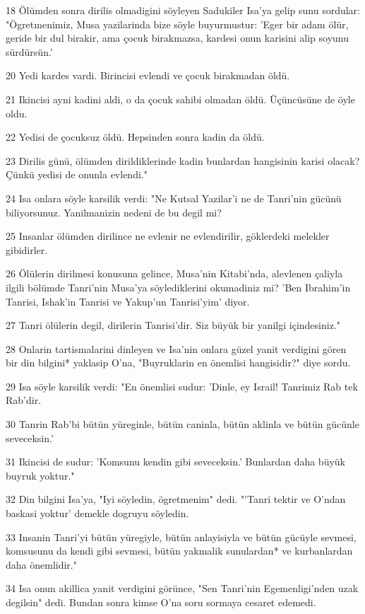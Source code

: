 \par 18 Ölümden sonra dirilis olmadigini söyleyen Sadukiler Isa'ya gelip sunu sordular: "Ögretmenimiz, Musa yazilarinda bize söyle buyurmustur: 'Eger bir adam ölür, geride bir dul birakir, ama çocuk birakmazsa, kardesi onun karisini alip soyunu sürdürsün.'
\par 20 Yedi kardes vardi. Birincisi evlendi ve çocuk birakmadan öldü.
\par 21 Ikincisi ayni kadini aldi, o da çocuk sahibi olmadan öldü. Üçüncüsüne de öyle oldu.
\par 22 Yedisi de çocuksuz öldü. Hepsinden sonra kadin da öldü.
\par 23 Dirilis günü, ölümden dirildiklerinde kadin bunlardan hangisinin karisi olacak? Çünkü yedisi de onunla evlendi."
\par 24 Isa onlara söyle karsilik verdi: "Ne Kutsal Yazilar'i ne de Tanri'nin gücünü biliyorsunuz. Yanilmanizin nedeni de bu degil mi?
\par 25 Insanlar ölümden dirilince ne evlenir ne evlendirilir, göklerdeki melekler gibidirler.
\par 26 Ölülerin dirilmesi konusuna gelince, Musa'nin Kitabi'nda, alevlenen çaliyla ilgili bölümde Tanri'nin Musa'ya söylediklerini okumadiniz mi? 'Ben Ibrahim'in Tanrisi, Ishak'in Tanrisi ve Yakup'un Tanrisi'yim' diyor.
\par 27 Tanri ölülerin degil, dirilerin Tanrisi'dir. Siz büyük bir yanilgi içindesiniz."
\par 28 Onlarin tartismalarini dinleyen ve Isa'nin onlara güzel yanit verdigini gören bir din bilgini* yaklasip O'na, "Buyruklarin en önemlisi hangisidir?" diye sordu.
\par 29 Isa söyle karsilik verdi: "En önemlisi sudur: 'Dinle, ey Israil! Tanrimiz Rab tek Rab'dir.
\par 30 Tanrin Rab'bi bütün yüreginle, bütün caninla, bütün aklinla ve bütün gücünle seveceksin.'
\par 31 Ikincisi de sudur: 'Komsunu kendin gibi seveceksin.' Bunlardan daha büyük buyruk yoktur."
\par 32 Din bilgini Isa'ya, "Iyi söyledin, ögretmenim" dedi. "'Tanri tektir ve O'ndan baskasi yoktur' demekle dogruyu söyledin.
\par 33 Insanin Tanri'yi bütün yüregiyle, bütün anlayisiyla ve bütün gücüyle sevmesi, komsusunu da kendi gibi sevmesi, bütün yakmalik sunulardan* ve kurbanlardan daha önemlidir."
\par 34 Isa onun akillica yanit verdigini görünce, "Sen Tanri'nin Egemenligi'nden uzak degilsin" dedi. Bundan sonra kimse O'na soru sormaya cesaret edemedi.

